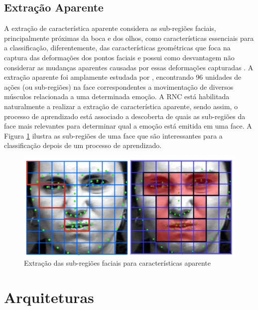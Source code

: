 \subsection{Extração Aparente}
A extração de característica aparente considera as sub-regiões faciais, principalmente próximas da boca e dos olhos, como características essenciais para a classificação, diferentemente, das características geométricas que foca na captura das deformações dos pontos faciais e possui como desvantagem não considerar as mudanças aparentes causadas por essas deformações capturadas \citep{art11}. A  extração aparente foi amplamente estudada por \cite{ekman1994}, encontrando 96 unidades de ações (ou sub-regiões) na face correspondentes a movimentação de diversos músculos relacionada a uma determinada emoção. A RNC está habilitada naturalmente a realizar a extração de característica aparente, sendo assim, o processo de aprendizado está associado a descoberta de quais as sub-regiões da face mais relevantes para determinar qual a emoção está emitida em uma face. A Figura \ref{fig:aparente} ilustra as sub-regiões de uma face que são interessantes para a classificação depois de um processo de aprendizado.


\begin{figure}
\centering
\includegraphics[scale=0.47]{figuras/tipoapa.png}
\caption{Extração das sub-regiões faciais para características aparente}
\label{fig:aparente}
\end{figure}

\section{Arquiteturas}\label{sec:arct}
